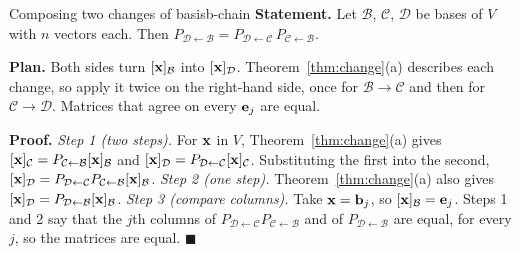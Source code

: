 \documentclass[11pt]{article}
\begin{document}
\begin{exmp}{Composing two changes of basis}{b-chain}
\textbf{Statement.} Let $\mathcal{B}$, $\mathcal{C}$, $\mathcal{D}$ be bases of $V$ with $n$ vectors each. Then $P_{\mathcal{D}\leftarrow\mathcal{B}}=P_{\mathcal{D}\leftarrow\mathcal{C}}\,P_{\mathcal{C}\leftarrow\mathcal{B}}$.

\textbf{Plan.} Both sides turn $[\mathbf{x}]_{\mathcal{B}}$ into $[\mathbf{x}]_{\mathcal{D}}$. Theorem~\ref{thm:change}(a) describes each change, so apply it twice on the right-hand side, once for $\mathcal{B}\to\mathcal{C}$ and then for $\mathcal{C}\to\mathcal{D}$. Matrices that agree on every $\mathbf{e}_j$ are equal.

\textbf{Proof.}
\emph{Step 1 (two steps).} For $\mathbf{x}$ in $V$, Theorem~\ref{thm:change}(a) gives $[\mathbf{x}]_{\mathcal{C}}=P_{\mathcal{C}\leftarrow\mathcal{B}}[\mathbf{x}]_{\mathcal{B}}$ and $[\mathbf{x}]_{\mathcal{D}}=P_{\mathcal{D}\leftarrow\mathcal{C}}[\mathbf{x}]_{\mathcal{C}}$. Substituting the first into the second, $[\mathbf{x}]_{\mathcal{D}}=P_{\mathcal{D}\leftarrow\mathcal{C}}P_{\mathcal{C}\leftarrow\mathcal{B}}[\mathbf{x}]_{\mathcal{B}}$.
\emph{Step 2 (one step).} Theorem~\ref{thm:change}(a) also gives $[\mathbf{x}]_{\mathcal{D}}=P_{\mathcal{D}\leftarrow\mathcal{B}}[\mathbf{x}]_{\mathcal{B}}$.
\emph{Step 3 (compare columns).} Take $\mathbf{x}=\mathbf{b}_j$, so $[\mathbf{x}]_{\mathcal{B}}=\mathbf{e}_j$. Steps 1 and 2 say that the $j$th columns of $P_{\mathcal{D}\leftarrow\mathcal{C}}P_{\mathcal{C}\leftarrow\mathcal{B}}$ and of $P_{\mathcal{D}\leftarrow\mathcal{B}}$ are equal, for every $j$, so the matrices are equal. \qquad$\blacksquare$


\end{exmp}
\end{document}
